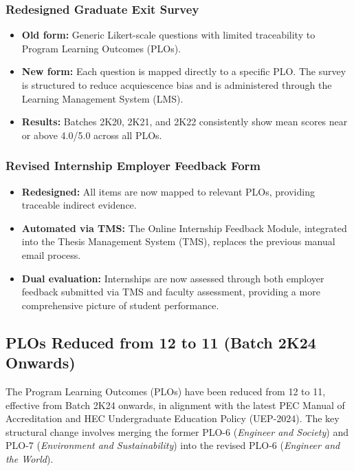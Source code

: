 \subsubsection{Redesigned Graduate Exit Survey}
\begin{itemize}[noitemsep, topsep=0pt]
    \item \textbf{Old form:} Generic Likert-scale questions with
    limited traceability to Program Learning Outcomes (PLOs).

    \item \textbf{New form:} Each question is mapped directly to a
    specific PLO. The survey is structured to reduce acquiescence
    bias and is administered through the Learning Management System (LMS).

    \item \textbf{Results:} Batches 2K20, 2K21, and 2K22 consistently
    show mean scores near or above 4.0/5.0 across all PLOs.
\end{itemize}

\subsubsection{Revised Internship Employer Feedback Form}
\begin{itemize} [noitemsep, topsep=0pt]
    \item \textbf{Redesigned:} All items are now mapped to relevant PLOs, providing traceable indirect evidence. 

    \item \textbf{Automated via TMS:} The Online Internship Feedback
    Module, integrated into the Thesis Management System (TMS),
    replaces the previous manual email process.

    \item \textbf{Dual evaluation:} Internships are now assessed through
    both employer feedback submitted via TMS and faculty assessment,
    providing a more comprehensive picture of student performance.
\end{itemize}




\subsection{PLOs Reduced from 12 to 11 (Batch 2K24 Onwards)}
\label{plo-reduction-12-to-11}

The Program Learning Outcomes (PLOs) have been reduced from 12 to 11,
effective from Batch 2K24 onwards, in alignment with the latest PEC
Manual of Accreditation and HEC Undergraduate Education Policy (UEP-2024).
The key structural change involves merging the former PLO-6
(\textit{Engineer and Society}) and PLO-7
(\textit{Environment and Sustainability}) into the revised PLO-6
(\textit{Engineer and the World}).


